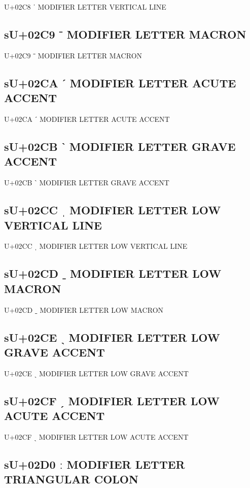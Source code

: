 U+02C8 ˈ MODIFIER LETTER VERTICAL LINE

\subsection{sU+02C9 ˉ MODIFIER LETTER MACRON}

U+02C9 ˉ MODIFIER LETTER MACRON

\subsection{sU+02CA ˊ MODIFIER LETTER ACUTE ACCENT}

U+02CA ˊ MODIFIER LETTER ACUTE ACCENT

\subsection{sU+02CB ˋ MODIFIER LETTER GRAVE ACCENT}

U+02CB ˋ MODIFIER LETTER GRAVE ACCENT

\subsection{sU+02CC ˌ MODIFIER LETTER LOW VERTICAL LINE}

U+02CC ˌ MODIFIER LETTER LOW VERTICAL LINE

\subsection{sU+02CD ˍ MODIFIER LETTER LOW MACRON}

U+02CD ˍ MODIFIER LETTER LOW MACRON

\subsection{sU+02CE ˎ MODIFIER LETTER LOW GRAVE ACCENT}

U+02CE ˎ MODIFIER LETTER LOW GRAVE ACCENT

\subsection{sU+02CF ˏ MODIFIER LETTER LOW ACUTE ACCENT}

U+02CF ˏ MODIFIER LETTER LOW ACUTE ACCENT

\subsection{sU+02D0 ː MODIFIER LETTER TRIANGULAR COLON}

